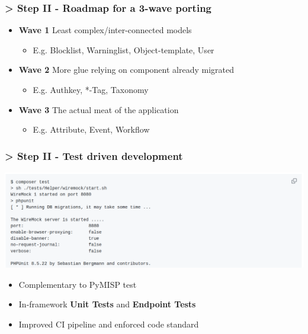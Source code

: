 \begin{frame}
    \frametitle{> Step II - Roadmap for a 3-wave porting}
    \begin{itemize}
        \setlength\itemsep{1em}
        \item[] \textbf{\color{main}Wave 1} Least complex/inter-connected models
        \begin{itemize}
            \item E.g. Blocklist, Warninglist, Object-template, User
        \end{itemize}
        \item[] \textbf{\color{main}Wave 2} More glue relying on component already migrated
        \begin{itemize}
            \item E.g. Authkey, *-Tag, Taxonomy
        \end{itemize}
        \item[] \textbf{\color{main}Wave 3} The actual meat of the application
        \begin{itemize}
            \item E.g. Attribute, Event, Workflow
        \end{itemize}
    \end{itemize}
\end{frame}

\begin{frame}
    \frametitle{> Step II - Test driven development}
    \begin{center}
        \includegraphics[width=1.0\linewidth]{pictures/phpunit.png}
    \end{center}
    \begin{itemize}
        \item Complementary to PyMISP test
        \item In-framework \textbf{Unit Tests} and \textbf{Endpoint Tests}
        \item Improved CI pipeline and enforced code standard
    \end{itemize}
\end{frame}

